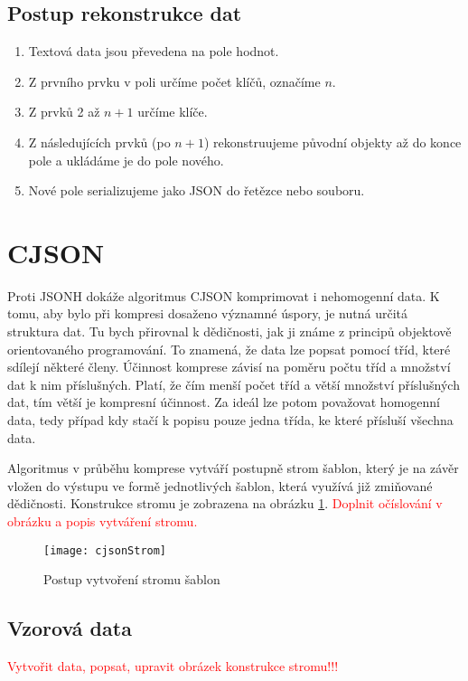 \subsection{Postup rekonstrukce dat}
\begin{enumerate}
\item Textová data jsou převedena na pole hodnot.
\item Z prvního prvku v poli určíme počet klíčů, označíme $n$.
\item Z prvků 2 až $n+1$ určíme klíče.
\item Z následujících prvků (po $n+1$) rekonstruujeme původní objekty až do konce pole a ukládáme je do pole nového.
\item Nové pole serializujeme jako JSON do řetězce nebo souboru.
\end{enumerate}

\section{CJSON}
Proti JSONH dokáže algoritmus CJSON komprimovat i nehomogenní data. K tomu, aby bylo při kompresi dosaženo významné úspory, je nutná určitá struktura dat. Tu bych přirovnal k dědičnosti, jak ji známe z principů objektově orientovaného programování. To znamená, že data lze popsat pomocí tříd, které sdílejí některé členy. Účinnost komprese závisí na poměru počtu tříd a množství dat k nim příslušných. Platí, že čím menší počet tříd a větší množství příslušných dat, tím větší je kompresní účinnost. Za ideál lze potom považovat homogenní data, tedy případ kdy stačí k popisu pouze jedna třída, ke které přísluší všechna data.

Algoritmus v průběhu komprese vytváří postupně strom šablon, který je na závěr vložen do výstupu ve formě jednotlivých šablon, která využívá již zmiňované dědičnosti. Konstrukce stromu je zobrazena na obrázku \ref{cjsonKonstrukceStromu}. \textcolor{red}{Doplnit očíslování v obrázku a popis vytváření stromu.}

\begin{figure}[!htb]
\centering
\texttt{[image: cjsonStrom]}
\caption{Postup vytvoření stromu šablon}
\label{cjsonKonstrukceStromu}
\end{figure}

\subsection{Vzorová data}
\textcolor{red}{Vytvořit data, popsat, upravit obrázek konstrukce stromu!!!}


